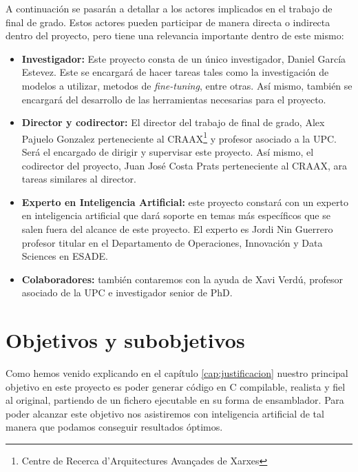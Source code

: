 
A continuación se pasarán a detallar a los actores implicados en el trabajo de final
de grado. Estos actores pueden participar de manera directa o indirecta dentro del
proyecto, pero tiene una relevancia importante dentro de este mismo:

\begin{itemize}
    \item \textbf{Investigador:} Este proyecto consta de un único investigador, Daniel
        García Estevez. Este se encargará de hacer tareas tales como la investigación
        de modelos a utilizar, metodos de \textit{fine-tuning}, entre otras. Así mismo,
        también se encargará del desarrollo de las herramientas necesarias para el proyecto.
    \item \textbf{Director y codirector:} El director del trabajo de final de grado, Alex
        Pajuelo Gonzalez perteneciente al CRAAX\footnote{Centre de Recerca d'Arquitectures
        Avançades de Xarxes} y profesor asociado a la UPC. Será el encargado de dirigir y
        supervisar este proyecto. Así mismo, el codirector del proyecto, Juan José Costa Prats
        perteneciente al CRAAX, ara tareas similares al director.
    \item \textbf{Experto en Inteligencia Artificial:} este proyecto constará con un experto en
        inteligencia artificial que dará soporte en temas más específicos que se salen fuera del
        alcance de este proyecto. El experto es Jordi Nin Guerrero profesor titular en el
        Departamento de Operaciones, Innovación y Data Sciences en ESADE.
    \item \textbf{Colaboradores:} también contaremos con la ayuda de Xavi Verdú, profesor asociado
        de la UPC e investigador senior de PhD.
\end{itemize}

\section{Objetivos y subobjetivos}
\label{sec:objetivos}


Como hemos venido explicando en el capítulo \ref{cap:justificacion} nuestro principal
objetivo en este proyecto es poder generar código en C compilable, realista y fiel
al original, partiendo de un fichero ejecutable en su forma de ensamblador. Para
poder alcanzar este objetivo nos asistiremos con inteligencia artificial de tal
manera que podamos conseguir resultados óptimos.

